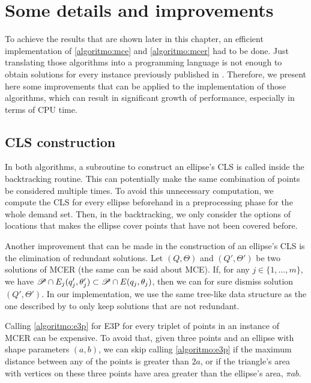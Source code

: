 \section{Some details and improvements}\label{section:improvements}

To achieve the results that are shown later in this chapter, an efficient implementation of \autoref{algoritmo:mce} and \autoref{algoritmo:mcer} had to be done. Just translating those algorithms into a programming language is not enough to obtain solutions for every instance previously published in .
Therefore, we present here some improvements that can be applied to the implementation of those algorithms, which can result in significant growth of performance, especially in terms of CPU time.

\subsection{CLS construction}

In both algorithms, a subroutine to construct an ellipse's CLS is called inside the backtracking routine. This can potentially make the same combination of points be considered multiple times.
To avoid this unnecessary computation, we compute the CLS for every ellipse beforehand in a preprocessing phase for the whole demand set. Then, in the backtracking, we only consider the options of locations that makes the ellipse cover points that have not been covered before.

Another improvement that can be made in the construction of an ellipse's CLS is the elimination of redundant solutions.
Let $(Q, \Theta)$ and $(Q', \Theta')$ be two solutions of MCER (the same can be said about MCE). If, for any $j \in \{1, \dots, m\}$, we have $\mathscr{P} \cap E_j(q_j', \theta_j') \subset \mathscr{P} \cap E(q_j, \theta_j)$, then we can for sure dismiss solution $(Q', \Theta')$.
In our implementation, we use the same tree-like data structure as the one described by  to only keep solutions that are not redundant.

Calling \autoref{algoritmo:e3p} for E3P for every triplet of points in an instance of MCER can be expensive. To avoid that, given three points and an ellipse with shape parameters $(a, b)$, we can skip calling \autoref{algoritmo:e3p} if the maximum distance between any of the points is greater than $2a$, or if the triangle's area with vertices on these three points have area greater than the ellipse's area, $\pi ab$.

